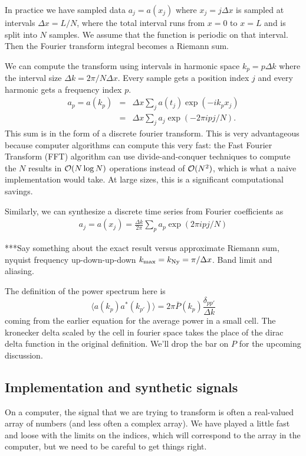 In practice we have sampled data $a_j = a(x_j)$ where $x_j = j\Delta x$ is sampled at intervals $\Delta x = L/N$, where the total interval runs from $x=0$ to $x=L$ and is split into $N$ samples.  We assume that the function is periodic on that interval.  Then the Fourier transform integral becomes a Riemann sum.


We can compute the transform using intervals in harmonic space $k_p = p\Delta k$ where the interval size $\Delta k = 2\pi/N\Delta x$.  Every sample gets a position index $j$ and every harmonic gets a frequency index $p$.
\begin{eqnarray}%
  a_p = a(k_p) & = & \Delta x \sum_j a(t_j) \exp(- i k_p  x_j) \\
  & = & \Delta x \sum_j a_j \exp(-2\pi i pj/N). \label{eqn:dft}
\end{eqnarray}
 This sum is in the form of a discrete fourier transform.  This is very advantageous because computer algorithms can compute this very fast: the Fast Fourier Transform (FFT) algorithm can use divide-and-conquer techniques to compute the $N$ results in ${\cal O}(N \log N)$ operations instead of ${\cal O}(N^2)$, which is what a naive implementation would take.  At large sizes, this is a significant computational savings.

 Similarly, we can synthesize a discrete time series from Fourier coefficients as
 \begin{eqnarray}
   a_j = a(x_j) = \frac{\Delta k}{2\pi}  \sum_p a_p \exp(2\pi i pj/N) \label{eqn:idft}
 \end{eqnarray}

 ***Say something about the exact result versus approximate Riemann sum, nyquist frequency up-down-up-down $k_{\rm max} = k_{\rm Ny} = \pi / \Delta x$.  Band limit and aliasing.

 
 The definition of the power spectrum here is
 \begin{equation}
   \langle a(k_p) a^*(k_{p'}) \rangle = 2\pi \bar P(k_p) \frac{\delta_{pp'}}{\Delta k} \label{eqn:power_spectrum_definition_discrete}
  \end{equation}
 coming from the earlier equation for the average power in a small cell.  The kronecker delta scaled by the cell in fourier space takes the place of the dirac delta function in the original definition.  We'll drop the bar on $P$ for the upcoming discussion.

\subsection{Implementation and synthetic signals}
On a computer, the signal that we are trying to transform is often a real-valued array of numbers (and less often a complex array).  We have played a little fast and loose with the limits on the indices, which will correspond to the array in the computer, but we need to be careful to get things right.

